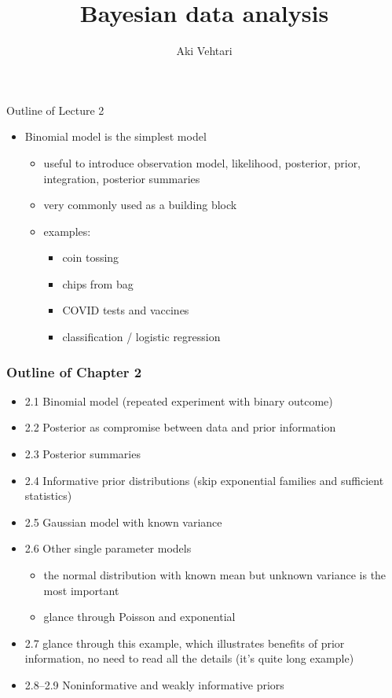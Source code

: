 \documentclass[english,t]{beamer}
\date{}
\title[]{Bayesian data analysis}
\subtitle{}
\author{Aki Vehtari}
\institute[Aalto University]{}
\begin{document}
 


\begin{frame}{Outline of Lecture 2}

  \begin{itemize}
  \item Binomial model is the simplest model
    \begin{itemize}
    \item useful to introduce observation model, likelihood,
      posterior, prior, integration, posterior summaries
    \item very commonly used as a building block
    \item examples:
      \begin{itemize}
      \item coin tossing
      \item chips from bag
      \item COVID tests and vaccines
      \item classification / logistic regression
      \end{itemize}
    \end{itemize}
  \end{itemize}
  
\end{frame}

\begin{frame}

  \frametitle{Outline of Chapter 2}

  \begin{itemize}
  \item 2.1 Binomial model (repeated experiment with binary outcome)
  \item 2.2 Posterior as compromise between data and prior information
  \item 2.3 Posterior summaries
  \item 2.4 Informative prior distributions (skip exponential families and sufficient statistics)
  \item 2.5 Gaussian model with known variance
  \item 2.6 Other single parameter models
    \begin{itemize}
    \item the normal distribution with known mean but
      unknown variance is the most important
    \item glance through Poisson and exponential
    \end{itemize}
  \item 2.7 glance through this example, which illustrates benefits of prior information, no need to read all the details (it's quite long example)
  \item 2.8--2.9 Noninformative and weakly informative priors
  \end{itemize}

\end{frame}
\end{document}
